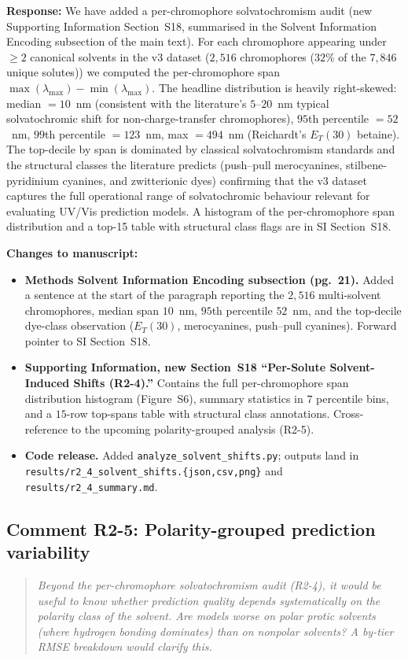 \documentclass[11pt]{article}
\newenvironment{reviewer}{%
  \begin{quote}\itshape\color{black!70}}{%
  \end{quote}}
\newcommand{\response}[1]{\noindent\textbf{Response:} #1\par\medskip}
\newenvironment{changes}{%
  \noindent\textbf{Changes to manuscript:}
  \begin{itemize}[leftmargin=2em,itemsep=2pt]}{%
  \end{itemize}\medskip}
\begin{document}
\response{We have added a per-chromophore solvatochromism audit (new Supporting Information Section~S18, summarised in the Solvent Information Encoding subsection of the main text). For each chromophore appearing under $\geq 2$ canonical solvents in the v3 dataset ($2{,}516$ chromophores ($32$\% of the $7{,}846$ unique solutes)) we computed the per-chromophore span $\max(\lambda_{\max}) - \min(\lambda_{\max})$. The headline distribution is heavily right-skewed: median $= 10$~nm (consistent with the literature's $5$--$20$~nm typical solvatochromic shift for non-charge-transfer chromophores), $95$th percentile $= 52$~nm, $99$th percentile $= 123$~nm, max $= 494$~nm (Reichardt's $E_T(30)$ betaine). The top-decile by span is dominated by classical solvatochromism standards and the structural classes the literature predicts (push--pull merocyanines, stilbene-pyridinium cyanines, and zwitterionic dyes) confirming that the v3 dataset captures the full operational range of solvatochromic behaviour relevant for evaluating UV/Vis prediction models. A histogram of the per-chromophore span distribution and a top-15 table with structural class flags are in SI Section~S18.}

\begin{changes}
  \item \textbf{Methods Solvent Information Encoding subsection (pg.\ 21).} Added a sentence at the start of the paragraph reporting the $2{,}516$ multi-solvent chromophores, median span $10$~nm, $95$th percentile $52$~nm, and the top-decile dye-class observation ($E_T(30)$, merocyanines, push--pull cyanines). Forward pointer to SI Section~S18.
  \item \textbf{Supporting Information, new Section~S18 ``Per-Solute Solvent-Induced Shifts (R2-4).''} Contains the full per-chromophore span distribution histogram (Figure~S6), summary statistics in $7$ percentile bins, and a $15$-row top-spans table with structural class annotations. Cross-reference to the upcoming polarity-grouped analysis (R2-5).
  \item \textbf{Code release.} Added \texttt{analyze\_solvent\_shifts.py}; outputs land in \texttt{results/r2\_4\_solvent\_shifts.\{json,csv,png\}} and \texttt{results/r2\_4\_summary.md}.
\end{changes}

\subsection*{Comment R2-5: Polarity-grouped prediction variability}
\begin{reviewer}
Beyond the per-chromophore solvatochromism audit (R2-4), it would be useful to know whether prediction quality depends systematically on the polarity class of the solvent. Are models worse on polar protic solvents (where hydrogen bonding dominates) than on nonpolar solvents? A by-tier RMSE breakdown would clarify this.
\end{reviewer}
\end{document}

